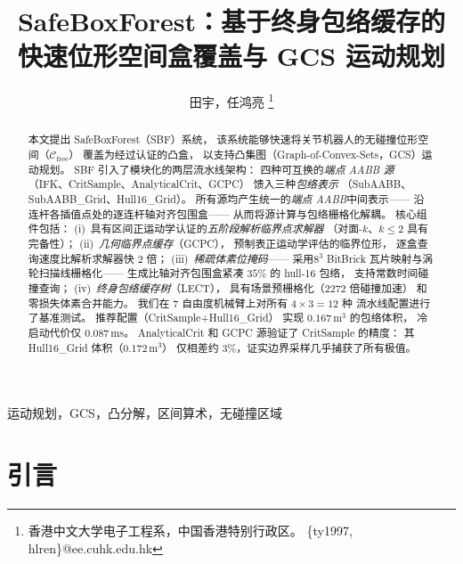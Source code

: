 \documentclass[journal]{IEEEtran}
\newcommand{\Cfree}{\mathcal{C}_\text{free}}
\begin{document}
\title{SafeBoxForest：基于终身包络缓存的\\
快速位形空间盒覆盖与 GCS 运动规划}

\author{
  田宇，任鸿亮
  \thanks{香港中文大学电子工程系，中国香港特别行政区。
  \{ty1997, hlren\}@ee.cuhk.edu.hk}
}


\maketitle

\begin{abstract}
本文提出 SafeBoxForest（SBF）系统，
该系统能够快速将关节机器人的无碰撞位形空间（$\Cfree$）
覆盖为经过认证的凸盒，
以支持凸集图（Graph-of-Convex-Sets，GCS）运动规划。
SBF 引入了模块化的两层流水线架构：
四种可互换的\emph{端点 AABB 源}
（IFK、CritSample、AnalyticalCrit、GCPC）
馈入三种\emph{包络表示}
（SubAABB、SubAABB\_Grid、Hull16\_Grid）。
所有源均产生统一的\emph{端点 AABB}中间表示——
沿连杆各插值点处的逐连杆轴对齐包围盒——
从而将源计算与包络栅格化解耦。
核心组件包括：
(i)~具有区间正运动学认证的\emph{五阶段解析临界点求解器}
（对面-$k$、$k \leq 2$ 具有完备性）；
(ii)~\emph{几何临界点缓存}（GCPC），
预制表正运动学评估的临界位形，
逐盒查询速度比解析求解器快 $2$ 倍；
(iii)~\emph{稀疏体素位掩码}——
采用$8^3$ BitBrick 瓦片映射与涡轮扫描线栅格化——
生成比轴对齐包围盒紧凑 $35\%$ 的 hull-16 包络，
支持常数时间碰撞查询；
(iv)~\emph{终身包络缓存树}（LECT），
具有场景预栅格化（$2272$ 倍碰撞加速）
和零损失体素合并能力。
我们在 7 自由度机械臂上对所有 $4{\times}3{=}12$ 种
流水线配置进行了基准测试。
推荐配置（CritSample+Hull16\_Grid）
实现 $0.167$\,m$^3$ 的包络体积，
冷启动代价仅 $0.087$\,ms。
AnalyticalCrit 和 GCPC 源验证了 CritSample 的精度：
其 Hull16\_Grid 体积（$0.172$\,m$^3$）
仅相差约 $3\%$，证实边界采样几乎捕获了所有极值。
\end{abstract}

\begin{IEEEkeywords}
运动规划，GCS，凸分解，区间算术，无碰撞区域
\end{IEEEkeywords}

\section{引言}\label{sec:intro}
\end{document}
